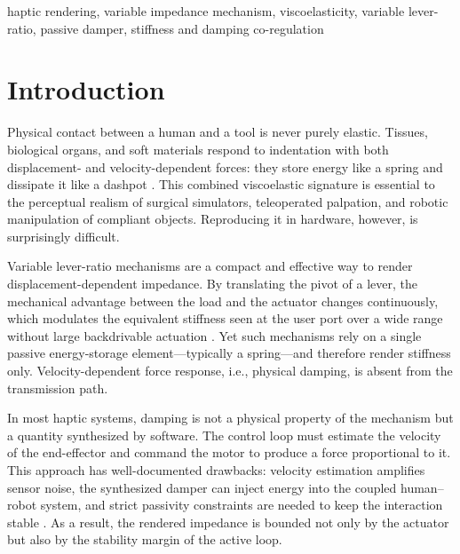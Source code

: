 ﻿\documentclass[conference]{IEEEtran}
\begin{document}
\begin{IEEEkeywords}
haptic rendering, variable impedance mechanism, viscoelasticity, variable
lever-ratio, passive damper, stiffness and damping co-regulation
\end{IEEEkeywords}

\section{Introduction}
Physical contact between a human and a tool is never purely elastic. Tissues,
biological organs, and soft materials respond to indentation with both
displacement- and velocity-dependent forces: they store energy like a spring
and dissipate it like a dashpot \cite{fun1980biomechanics}. This combined
viscoelastic signature is essential to the perceptual realism of surgical
simulators, teleoperated palpation, and robotic manipulation of compliant
objects. Reproducing it in hardware, however, is surprisingly difficult.

Variable lever-ratio mechanisms are a compact and effective way to render
displacement-dependent impedance. By translating the pivot of a lever, the
mechanical advantage between the load and the actuator changes continuously,
which modulates the equivalent stiffness seen at the user port over a wide
range without large backdrivable actuation \cite{vanderborght2013variable,
mehling2007increasing}. Yet such mechanisms rely on a single passive
energy-storage element---typically a spring---and therefore render stiffness
only. Velocity-dependent force response, i.e., physical damping, is absent
from the transmission path.

In most haptic systems, damping is not a physical property of the mechanism
but a quantity synthesized by software. The control loop must estimate the
velocity of the end-effector and command the motor to produce a force
proportional to it. This approach has well-documented drawbacks: velocity
estimation amplifies sensor noise, the synthesized damper can inject energy
into the coupled human--robot system, and strict passivity constraints are
needed to keep the interaction stable \cite{colgate1994factors}. As a result,
the rendered impedance is bounded not only by the actuator but also by the
stability margin of the active loop.
\end{document}
